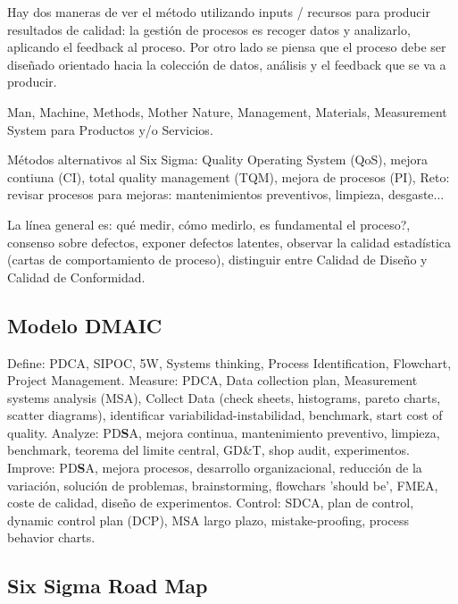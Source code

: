 \documentclass[]{article}
\begin{document}
Hay dos maneras de ver el método utilizando inputs / recursos para producir resultados de calidad: la gestión de procesos es recoger datos y analizarlo, aplicando el feedback al proceso. Por otro lado se piensa que el proceso debe ser diseñado orientado hacia la colección de datos, análisis y el feedback que se va a producir.

Man, Machine, Methods, Mother Nature, Management, Materials, Measurement System para Productos y/o Servicios.

Métodos alternativos al Six Sigma: Quality Operating System (QoS), mejora contiuna (CI), total quality management (TQM), mejora de procesos (PI), Reto: revisar procesos para mejoras: mantenimientos preventivos, limpieza, desgaste...

La línea general es: qué medir, cómo medirlo, es fundamental el proceso?, consenso sobre defectos, exponer defectos latentes, observar la calidad estadística (cartas de comportamiento de proceso), distinguir entre Calidad de Diseño y Calidad de Conformidad. 

\subsection{Modelo DMAIC}
Define: PDCA, SIPOC, 5W, Systems thinking, Process Identification, Flowchart, Project Management. \newline
Measure: PDCA, Data collection plan, Measurement systems analysis (MSA), Collect Data (check sheets, histograms, pareto charts, scatter diagrams), identificar variabilidad-instabilidad, benchmark, start cost of quality. \newline
Analyze: PD\textbf{S}A, mejora continua, mantenimiento preventivo, limpieza, benchmark, teorema del limite central, GD\&T, shop audit, experimentos. \newline
Improve: PD\textbf{S}A, mejora procesos, desarrollo organizacional, reducción de la variación, solución de problemas, brainstorming, flowchars 'should be', FMEA, coste de calidad, diseño de experimentos. \newline
Control: SDCA, plan de control, dynamic control plan (DCP), MSA largo plazo, mistake-proofing, process behavior charts.

\subsection{Six Sigma Road Map}
\end{document}
